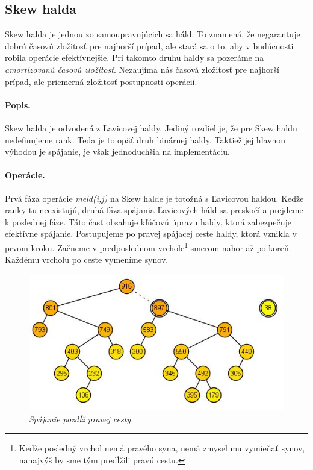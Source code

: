 \subsection{Skew halda} 
Skew halda je jednou zo samoupravujúcich sa háld. To znamená, že negarantuje dobrú časovú zložitosť pre najhorší prípad, ale stará 
sa o to, aby v budúcnosti robila operácie efektívnejšie. Pri takomto druhu haldy sa pozeráme na \emph{amortizovanú časovú 
zložitosť}. Nezaujíma nás časová zložitosť pre najhorší prípad, ale priemerná zložitosť postupnosti operácií.

\paragraph{Popis.}
Skew halda je odvodená z Ľavicovej haldy. Jediný rozdiel je, že pre Skew haldu nedefinujeme rank. Teda je to opäť druh binárnej 
haldy. Taktiež jej hlavnou výhodou je spájanie, je však jednoduchšia na implementáciu.


\paragraph{Operácie.}
Prvá fáza operácie \emph{meld(i,j)} na Skew halde je totožná s Ľavicovou haldou. Keďže ranky tu neexistujú, druhá fáza spájania 
Ľavicových háld sa preskočí a prejdeme k poslednej fáze. Táto časť obsahuje kľúčovú úpravu haldy, ktorá zabezpečuje efektívne 
spájanie. Postupujeme po pravej spájacej ceste haldy, ktorá vznikla v prvom kroku. Začneme v predposlednom vrchole\footnote{Keďže posledný vrchol nemá pravého syna, nemá zmysel mu vymieňať synov, nanajvýš by sme tým predĺžili pravú cestu.} smerom nahor až po koreň. Každému vrcholu po ceste vymeníme synov.


\begin{figure}
\includegraphics[width=\columnwidth]{obrazky/skewinsert.png}
\caption{\emph{Spájanie pozdĺž pravej cesty.}} 
\label{img:skew} 
\end{figure}

